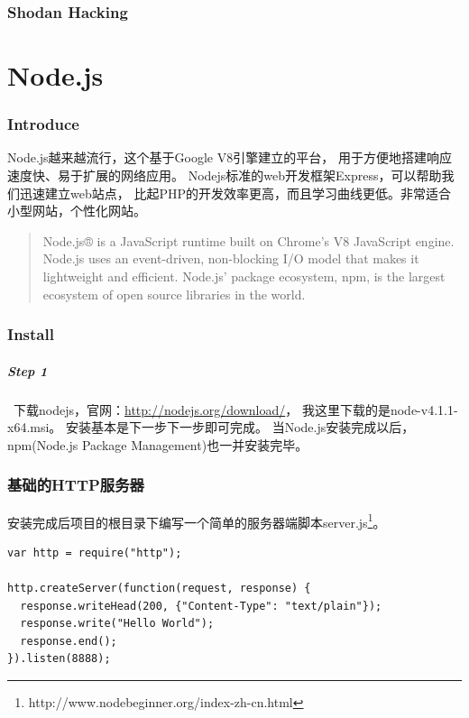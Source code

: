 \documentclass{book}
\begin{document}
\subsection{Shodan Hacking}

\chapter{Node.js}

\clearpage
\mbox{}         
\clearpage

\subsection{Introduce}

Node.js越来越流行，这个基于Google V8引擎建立的平台， 
用于方便地搭建响应速度快、易于扩展的网络应用。
Nodejs标准的web开发框架Express，可以帮助我们迅速建立web站点，
比起PHP的开发效率更高，而且学习曲线更低。非常适合小型网站，个性化网站。

\begin{quotation}
Node.js® is a JavaScript runtime built on Chrome's V8 JavaScript engine. 
Node.js uses an event-driven, non-blocking I/O model that makes it lightweight and efficient. 
Node.js' package ecosystem, npm, is the largest ecosystem of open source libraries in the world.
\end{quotation}

\subsection{Install}

\paragraph{Step 1}~下载nodejs，官网：\url{http://nodejs.org/download/}，
我这里下载的是node-v4.1.1-x64.msi。
安装基本是下一步下一步即可完成。
当Node.js安装完成以后，npm(Node.js Package Management)也一并安装完毕。


\subsection{基础的HTTP服务器}

安装完成后项目的根目录下编写一个简单的服务器端脚本server.js\footnote{http://www.nodebeginner.org/index-zh-cn.html}。

\begin{lstlisting}[language=VBScript]
var http = require("http");

http.createServer(function(request, response) {
  response.writeHead(200, {"Content-Type": "text/plain"});
  response.write("Hello World");
  response.end();
}).listen(8888);
\end{lstlisting}
\end{document}
